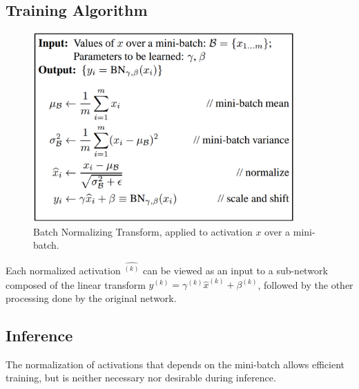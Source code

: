 \documentclass[a4paper, 12pt]{book} %
\begin{document}
\subsection{Training Algorithm}
\begin{figure}[htpb]
	\centering
	\includegraphics[width=10cm]{figures/bn_algorithm.png}
	\caption{Batch Normalizing Transform, applied to
activation $x$ over a mini-batch.}
	\label{fig:boat1}
\end{figure}
Each normalized activation $\hat{^{(k)}}$ can be viewed as an input to a sub-network composed of the linear transform $y^{(k)}=\gamma^{(k)}\hat{x}^{(k)}+\beta^{(k)}$, followed by the other processing done by the original network. 

\subsection{Inference}
The normalization of activations that
depends on the mini-batch allows efficient training, but is
neither necessary nor desirable during inference.
\end{document}
